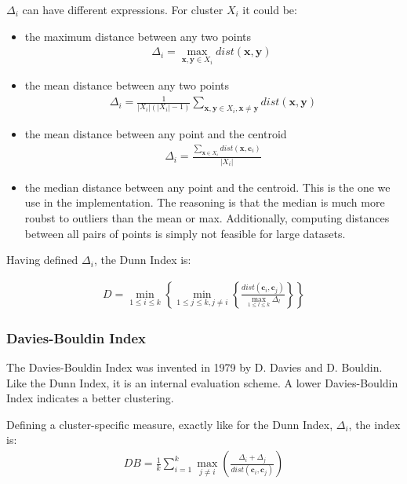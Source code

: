 \documentclass{article}
\begin{document}
$\Delta_i$ can have different expressions. For cluster $X_i$ it could be:
\begin{itemize}
    \item the maximum distance between any two points
        \begin{eqnarray}
            \Delta_i = \max_{\mathbf{x}, \mathbf{y} \in X_i} dist(\mathbf{x},
            \mathbf{y}) \;\textrm{}
        \end{eqnarray}
    \item the mean distance between any two points
        \begin{eqnarray}
            \Delta_i = \frac{1}{|X_i| (|X_i| - 1)} \sum_{\mathbf{x}, \mathbf{y} \in
            X_i, \mathbf{x} \ne \mathbf{y}} dist(\mathbf{x}, \mathbf{y})
        \end{eqnarray}
    \item the mean distance between any point and the centroid
        \begin{eqnarray}
            \Delta_i = \frac{\sum_{\mathbf{x} \in X_i} dist(\mathbf{x},
            \mathbf{c}_i)}{|X_i|}
        \end{eqnarray}
    \item the median distance between any point and the centroid. This is the
        one we use in the implementation. The reasoning is that the median is
        much more roubst to outliers than the mean or max. Additionally,
        computing distances between all pairs of points is simply not feasible
        for large datasets.
\end{itemize}

Having defined $\Delta_i$, the Dunn Index is:

\begin{eqnarray}
    D = \min_{1 \le i \le k} \left\{ \min_{1 \le j \le k, j \ne i} \left\{
        \frac{dist(\mathbf{c}_i, \mathbf{c}_j)}{\max_{1 \le l \le k} \Delta_l}
    \right\} \right\}
\end{eqnarray}

\subsubsection{Davies-Bouldin Index}
The Davies-Bouldin Index was invented in 1979 by D. Davies and D. Bouldin. Like
the Dunn Index, it is an internal evaluation scheme. A lower Davies-Bouldin
Index indicates a better clustering.

Defining a cluster-specific measure, exactly like for the Dunn Index,
$\Delta_i$, the index is:
\begin{eqnarray}
    DB = \frac{1}{k} \sum_{i = 1}^k \max_{j \ne i} \left( \frac{\Delta_i +
    \Delta_j}{dist(\mathbf{c}_i, \mathbf{c}_j)} \right)
\end{eqnarray}
\end{document}
